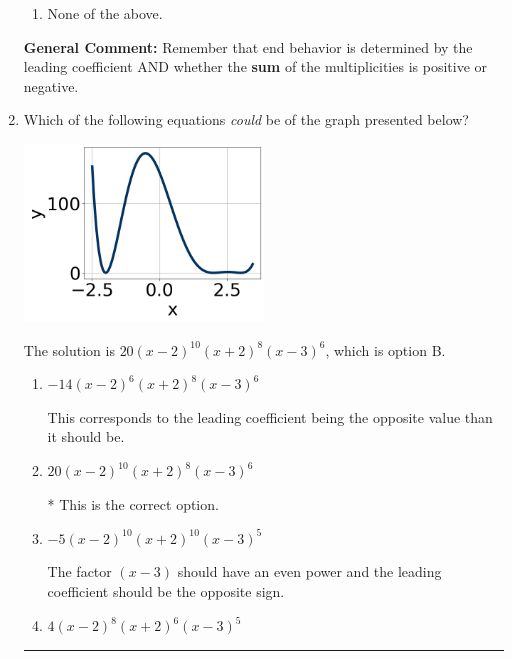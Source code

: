 \documentclass{extbook}[14pt]
\newcommand{\litem}[1]{\item #1

\rule{\textwidth}{0.4pt}}
\begin{document}
\begin{enumerate}
{\begin{enumerate}[label=\Alph*.]
\item None of the above.\end{enumerate}
\textbf{General Comment:} Remember that end behavior is determined by the leading coefficient AND whether the \textbf{sum} of the multiplicities is positive or negative.
}
\litem{
Which of the following equations \textit{could} be of the graph presented below?

\begin{center}
    \includegraphics[width=0.5\textwidth]{../Figures/polyGraphToFunctionCopyC.png}
\end{center}



The solution is \( 20(x - 2)^{10} (x + 2)^{8} (x - 3)^{6} \), which is option B.\begin{enumerate}[label=\Alph*.]
\item \( -14(x - 2)^{6} (x + 2)^{8} (x - 3)^{6} \)

This corresponds to the leading coefficient being the opposite value than it should be.
\item \( 20(x - 2)^{10} (x + 2)^{8} (x - 3)^{6} \)

* This is the correct option.
\item \( -5(x - 2)^{10} (x + 2)^{10} (x - 3)^{5} \)

The factor $(x - 3)$ should have an even power and the leading coefficient should be the opposite sign.
\item \( 4(x - 2)^{8} (x + 2)^{6} (x - 3)^{5} \)


\end{enumerate}}
\end{enumerate}
\end{document}
